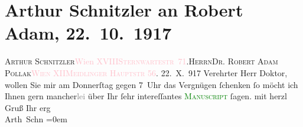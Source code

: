 

               \section[Arthur Schnitzler an Robert Adam, 22. 10. 1917]{ Arthur Schnitzler an Robert Adam, 22. 10. 1917}\nopagebreak{}\rehead{ }\normalsize\beginnumbering{} \toendnotes[C]{\smallbreak\pagebreak[2]} 
\toendnotes[C]{\smallbreak}\pstart{}{\pb}\textsc{Arthur Schnitzler}\pend{}\pstart{}\textcolor{pink}{Wien XVIII}{}\ledrightnote{\textcolor{pink}{VIII., Josefstadt}}\pend{}\pstart{}\textcolor{pink}{\textsc{Sternwartestr} 71}{}\ledrightnote{\textcolor{pink}{Sternwartestraße}}.\pend{}{\bigskip}\pstart{}\textsc{Herrn}\pend{}\pstart{}\textsc{Dr. Robert Adam Pollak}\pend{}\pstart{}\textcolor{pink}{\textsc{Wien XII}}{}\ledrightnote{\textcolor{pink}{XII., Meidling}}\pend{}\pstart{}\textcolor{pink}{\textsc{Meidlinger Hauptstr} 56}{}\ledrightnote{\textcolor{pink}{Meidlinger Hauptstraße}}.\pend{}{\bigskip}\pstart
           \raggedleft{}{\pb}22. X. 917\pend
           \pstart{}Verehrter Herr Doktor, \pend\pstart
           wollen Sie mir am Donnerſtag gegen 7 Uhr das Vergnügen
                    ſchenken ſo möcht ich Ihnen gern mancher\textcolor{gray}{lei} über Ihr ſehr
                    intereſſantes \textcolor{green}{\textsc{Manuscript}}{} ſagen.\pend
           \pstart
           mit herzl Gruß Ihr erg{\\[\baselineskip]}\spacefill\mbox{Arth Schn}\pend
           \leftskip=0em{}\endnumbering{}  
      